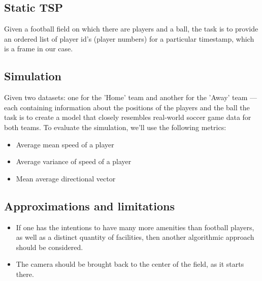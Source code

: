 \subsection{Static TSP}
Given a football field on which there are players and a ball, the task is to provide an ordered list of player id's (player numbers) for a particular timestamp, which is a frame in our case.

\subsection{Simulation}
Given two datasets: one for the 'Home' team and another for the 'Away' team — each containing information about the positions of the players and the ball the task is to create a model that closely resembles real-world soccer game data for both teams. To evaluate the simulation, we’ll use the following metrics:

\begin{itemize}
    \item Average mean speed of a player
    \item Average variance of speed of a player
    \item Mean average directional vector
\end{itemize}

\subsection{Approximations and limitations}
\begin{itemize}
    \item If one has the intentions to have many more amenities than football players, as well as a distinct quantity of facilities, then another algorithmic approach should be considered.
    \item The camera should be brought back to the center of the field, as it starts there.
\end{itemize}




